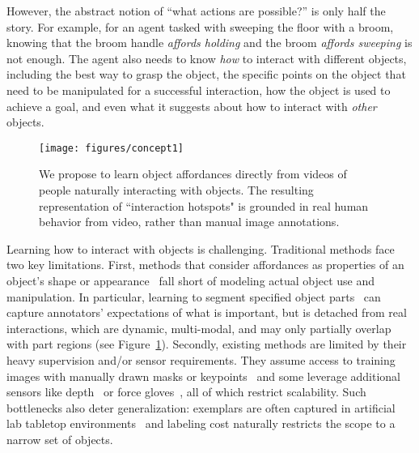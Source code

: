 \documentclass[10pt,twocolumn,letterpaper]{article}
\newcommand{\reffig}[1]{Figure~\ref{#1}}
\begin{document}
However, the abstract notion of ``what actions are possible?'' is only half the story. For example, for an agent tasked with sweeping the floor with a broom, knowing that the broom handle \emph{affords holding} and the broom \emph{affords sweeping} is not enough.  
The agent also needs to know \emph{how} to interact with different objects, including
the best way to grasp the object,
the specific points on the object that need to be manipulated for a successful interaction, how the object is used to achieve a goal, and even what it suggests about how to interact with \emph{other} objects. 




\begin{figure}[t!]
\centering
\texttt{[image: figures/concept1]}
\caption{We propose to learn object affordances directly from videos of people naturally interacting with objects.  The resulting  representation of ``interaction hotspots" is grounded in real human behavior from video, rather than manual image annotations.}
\label{fig:concept}
\end{figure}

Learning how to interact with objects is challenging.  Traditional methods face two key limitations.  First, methods that consider affordances as properties of an object's shape or appearance~\cite{myers2015affordance,grabner2011makes,hermans2011affordance} fall short of modeling actual object use and manipulation.  In particular, learning to segment specified object parts~\cite{nguyen2016detecting,sawatzky2017weakly,myers2015affordance,nguyen2017object} can capture annotators' expectations of what is important, but is detached from real interactions, which are dynamic, multi-modal, and may only partially overlap with part regions (see \reffig{fig:concept}).
Secondly, existing methods are limited by their heavy supervision and/or sensor requirements.  They  assume access to training images with manually drawn masks or keypoints~\cite{roy2016multi,do2017affordancenet,fang2018demo2vec} and some leverage additional sensors like depth~\cite{koppula2014physically,zhu2016inferring,zhu2015understanding} or force gloves~\cite{castellini2011using}, all of which restrict scalability.  Such bottlenecks also deter generalization: exemplars are often captured in artificial lab tabletop environments~\cite{myers2015affordance,koppula2014physically,sawatzky2017weakly} and labeling cost naturally restricts the scope to a narrow set of objects.
\end{document}
